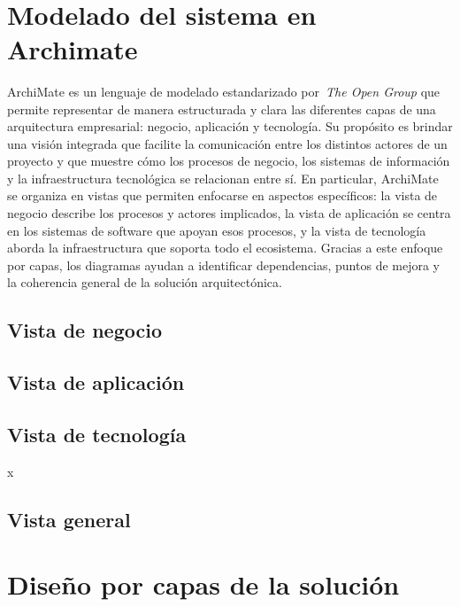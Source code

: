 \label{cap:disenio}
\mbox{}\\
\section{Modelado del sistema en Archimate}
ArchiMate es un lenguaje de modelado estandarizado por~\textit{The Open Group} que permite representar de manera estructurada y clara las diferentes capas de una arquitectura empresarial: negocio, aplicación y tecnología. Su propósito es brindar una visión integrada que facilite la comunicación entre los distintos actores de un proyecto y que muestre cómo los procesos de negocio, los sistemas de información y la infraestructura tecnológica se relacionan entre sí.
En particular, ArchiMate se organiza en vistas que permiten enfocarse en aspectos específicos: la vista de negocio describe los procesos y actores implicados, la vista de aplicación se centra en los sistemas de software que apoyan esos procesos, y la vista de tecnología aborda la infraestructura que soporta todo el ecosistema. Gracias a este enfoque por capas, los diagramas ayudan a identificar dependencias, puntos de mejora y la coherencia general de la solución arquitectónica.

\subsection{Vista de negocio}


\subsection{Vista de aplicación}


\subsection{Vista de tecnología}
x


\subsection{Vista general}


\section{Diseño por capas de la solución}

